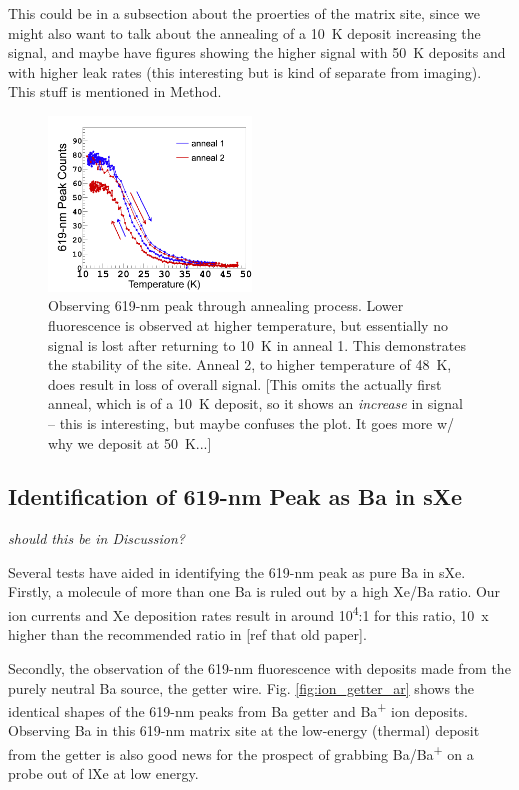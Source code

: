 \documentclass[aps,pra,reprint,superscriptaddress]{revtex4-1}
\begin{document}
{\color{gray}This could be in a subsection about the proerties of the matrix site, since we might also want to talk about the annealing of a 10~K deposit increasing the signal, and maybe have figures showing the higher signal with 50~K deposits and with higher leak rates (this interesting but is kind of separate from imaging).  This stuff is mentioned in Method.}

\begin{figure}
\includegraphics[width=0.48\textwidth]{figures/paper_single-atom_619-anneal_20150916_runs36and37_omitRun34_arrows.png}
\caption{Observing 619-nm peak through annealing process.  Lower fluorescence is observed at higher temperature, but essentially no signal is lost after returning to 10~K in anneal 1.  This demonstrates the stability of the site.  Anneal 2, to higher temperature of 48~K, does result in loss of overall signal.  {\color{red}[This omits the actually first anneal, which is of a 10~K deposit, so it shows an \emph{increase} in signal -- this is interesting, but maybe confuses the plot.  It goes more w/ why we deposit at 50~K...]}}
\label{fig:anneal}
\end{figure}

\subsection{Identification of 619-nm Peak as Ba in sXe}

{\color{gray}\emph{should this be in Discussion?}}

Several tests have aided in identifying the 619-nm peak as pure Ba in sXe.  Firstly, a molecule of more than one Ba is ruled out by a high Xe/Ba ratio.  Our ion currents and Xe deposition rates result in around 10\textsuperscript{4}:1 for this ratio, 10~x higher than the recommended ratio in [ref that old paper].

Secondly, the observation of the 619-nm fluorescence with deposits made from the purely neutral Ba source, the getter wire.  Fig. \ref{fig:ion_getter_ar} shows the identical shapes of the 619-nm peaks from Ba getter and Ba\textsuperscript{+} ion deposits.  Observing Ba in this 619-nm matrix site at the low-energy (thermal) deposit from the getter is also good news for the prospect of grabbing Ba/Ba\textsuperscript{+} on a probe out of lXe at low energy.
\end{document}
